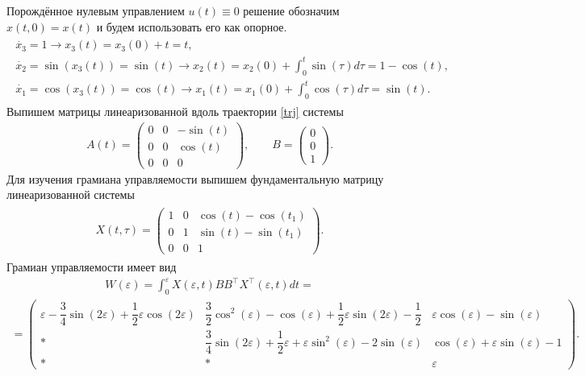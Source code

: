 \documentclass[../main.tex]{subfiles}
\begin{document}
    Порождённое нулевым управлением $ u(t) \equiv 0 $ решение обозначим $ x(t,0) = x(t) $ и будем использовать его как опорное. 
    \begin{gather}\label{trj}
        \begin{gathered}
            \dot{x_3} = 1 \longrightarrow x_3(t) = x_3(0) + t = t, \\
            \dot{x_2} = \sin(x_3(t)) = \sin(t) \longrightarrow x_2(t) = x_2(0) + \int_0^t \sin(\tau) d\tau = 1 - \cos(t),\\
            \dot{x_1} = \cos(x_3(t)) = \cos(t) \longrightarrow x_1(t) = x_1(0) + \int_0^t \cos(\tau) d\tau = \sin(t).
        \end{gathered}
    \end{gather}
    Выпишем матрицы линеаризованной вдоль траектории \eqref{trj} системы 
    \begin{gather*}
        A(t) = \begin{pmatrix}
            0 & 0 & -\sin(t) \\ 
            0 & 0 & \cos(t) \\ 
            0 & 0 & 0
        \end{pmatrix}, \qquad  B = \begin{pmatrix}
            0 \\ 
            0 \\ 
            1
        \end{pmatrix}.
    \end{gather*}
    Для изучения грамиана управляемости выпишем фундаментальную матрицу линеаризованной системы
    \begin{gather*}
        \begin{gathered}
            X(t,\tau) = \begin{pmatrix}
                1 & 0 & \cos(t)-\cos(t_1) \\ 
                0 & 1 & \sin(t)-\sin(t_1) \\ 
                0 & 0 & 1
            \end{pmatrix}.
        \end{gathered}    
    \end{gather*}
    Грамиан управляемости имеет вид
    \begin{gather*}
        W(\varepsilon) = \int_0^{\varepsilon}X(\varepsilon,t) B B^{\top} X^{\top}(\varepsilon,t)dt =
    \end{gather*}
    \begin{gather*}
        =\begin{pmatrix}
            \varepsilon-\dfrac{3}{4} \sin(2\varepsilon) +\dfrac{1}{2}\varepsilon \cos(2\varepsilon)& \dfrac{3}{2}\cos^2(\varepsilon) - \cos(\varepsilon) + \dfrac{1}{2}\varepsilon \sin(2 \varepsilon) - \dfrac{1}{2} &  \varepsilon\cos( \varepsilon)-\sin( \varepsilon) \\[8pt] 
            * & \dfrac{3}{4}\sin(2\varepsilon) + \dfrac{1}{2}\varepsilon + \varepsilon \sin^2(\varepsilon) - 2 \sin(\varepsilon) & \cos(\varepsilon) + \varepsilon\sin(\varepsilon)-1 \\ 
            * & * & \varepsilon
        \end{pmatrix}.    
    \end{gather*}
\end{document}
